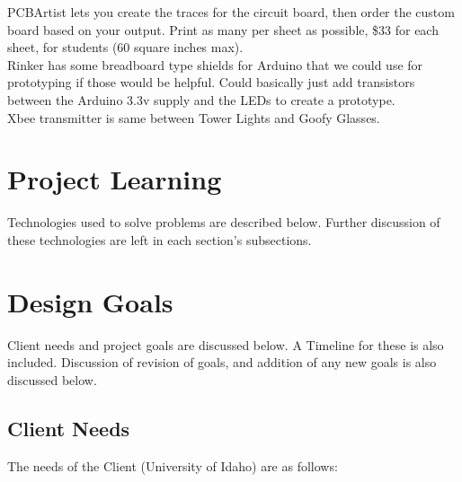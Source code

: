 \documentclass[12pt]{article}
\begin{document}
	\noindent
	PCBArtist lets you create the traces for the circuit board, then order the custom board based on your 		output. Print as many per sheet as possible, \$33 for each sheet, for students (60 square inches max).\\
	
	\noindent
	Rinker has some breadboard type shields for Arduino that we could use for prototyping if those would be 	helpful. Could basically just add transistors between the Arduino 3.3v supply and the LEDs to create a 		prototype.\\
	 
	\noindent	
	Xbee transmitter is same between Tower Lights and Goofy Glasses.\\ 	

	\clearpage

\section{Project Learning}
	Technologies used to solve problems are described below. Further discussion of these technologies are left in each section's subsections.

	\newpage
  
\section{Design Goals}
	Client needs and project goals are discussed below. A Timeline for these is also included. Discussion of revision of goals, and addition of any new goals is also discussed below.
	
	\subsection{Client Needs}
	The needs of the Client (University of Idaho) are as follows:
		
\end{document}
